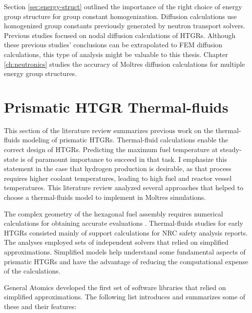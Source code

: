 Section \ref{sec:energy-struct} outlined the importance of the right choice of energy group structure for group constant homogenization.
Diffusion calculations use homogenized group constants previously generated by neutron transport solvers.
Previous studies focused on nodal diffusion calculations of HTGRs.
Although these previous studies' conclusions can be extrapolated to FEM diffusion calculations, this type of analysis might be valuable to this thesis.
Chapter \ref{ch:neutronics} studies the accuracy of Moltres diffusion calculations for multiple energy group structures.

\section{Prismatic HTGR Thermal-fluids}
\label{sec:litrev-thermalf}

This section of the literature review summarizes previous work on the thermal-fluids modeling of prismatic HTGRs.
Thermal-fluid calculations enable the correct design of \glspl{HTGR}.
Predicting the maximum fuel temperature at steady-state is of paramount importance to succeed in that task.
I emphasize this statement in the case that hydrogen production is desirable, as that process requires higher coolant temperatures, leading to high fuel and reactor vessel temperatures.
This literature review analyzed several approaches that helped to choose a thermal-fluids model to implement in Moltres simulations.

The complex geometry of the hexagonal fuel assembly requires numerical calculations for obtaining accurate evaluations \cite{tak_numerical_2008}.
Thermal-fluids studies for early \glspl{HTGR} consisted mainly of support calculations for \gls{NRC} safety analysis reports.
The analyses employed sets of independent solvers that relied on simplified approximations.
Simplified models help understand some fundamental aspects of prismatic HTGRs and have the advantage of reducing the computational expense of the calculations.

General Atomics \cite{shenoy_htgr_1974} developed the first set of software libraries that relied on simplified approximations.
The following list introduces and summarizes some of these and their features:

